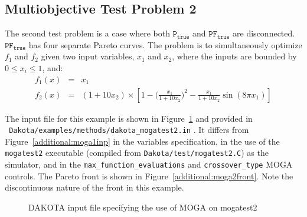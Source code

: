 \subsection{Multiobjective Test Problem 2}\label{additional:multiobjective:problem2}

The second test problem is a case where both $\mathtt{P_{true}}$ and
$\mathtt{PF_{true}}$ are disconnected.  $\mathtt{PF_{true}}$ has four
separate Pareto curves.  The problem is to simultaneously optimize
$f_1$ and $f_2$ given two input variables, $x_1$ and $x_2$,
where the inputs are bounded by $0 \leq x_{i} \leq 1$, and:
\begin{eqnarray*}
f_1(x) &=& x_1 \\
f_2(x) &=& (1+10x_2) \times \left[1-\bigg(\frac{x_1}{1+10x_2}\bigg)^2-
\frac{x_1}{1+10x_2}\sin(8\pi x_1)\right]
\end{eqnarray*}

The input file for this example is shown in
Figure~\ref{additional:moga2inp} and provided in \\ {\tt
Dakota/examples/methods/dakota\_mogatest2.in} .  It differs from
Figure~\ref{additional:moga1inp} in the variables specification, in
the use of the \texttt{mogatest2} executable (compiled from
\texttt{Dakota/test/mogatest2.C}) as the simulator, and in the
\texttt{max\_function\_evaluations} and \texttt{crossover\_type} MOGA
controls.  The Pareto front is shown in
Figure~\ref{additional:moga2front}.  Note the discontinuous nature of
the front in this example.

\begin{figure}
  \centering
  \begin{bigbox}
    \begin{small}
    \end{small}
  \end{bigbox}
  \caption{DAKOTA input file specifying the use of MOGA on mogatest2}
  \label{additional:moga2inp}
\end{figure}

